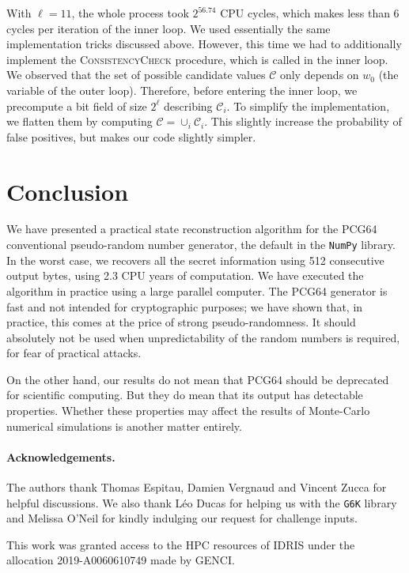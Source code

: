 \documentclass[submission,svgnames,journal=tosc]{iacrtrans}
\begin{document}
With $\ell=11$, the whole process took $2^{56.74}$ CPU cycles, which makes less
than 6 cycles per iteration of the inner loop. We used essentially the same
implementation tricks discussed above. However, this time we had to additionally
implement the \textsc{ConsistencyCheck} procedure, which is called in the inner
loop. We observed that the set of possible candidate values $\mathcal{C}$ only
depends on $w_0$ (the variable of the outer loop). Therefore, before entering
the inner loop, we precompute a bit field of size $2^\ell$ describing
$\mathcal{C}_i$. To simplify the implementation, we flatten them by computing
$\mathcal{C} = \cup_i \mathcal{C}_i$. This slightly increase the probability of
false positives, but makes our code slightly simpler.

\section{Conclusion}

We have presented a practical state reconstruction algorithm for the
\textsf{PCG64} conventional pseudo-random number generator, the default in the
\texttt{NumPy} library. In the worst case, we recovers all the secret
information using 512 consecutive output bytes, using 2.3 CPU years of
computation. We have executed the algorithm in practice using a large parallel
computer. The \textsf{PCG64} generator is fast and not intended for
cryptographic purposes; we have shown that, in practice, this comes at the price
of strong pseudo-randomness. It should absolutely not be used when
unpredictability of the random numbers is required, for fear of practical
attacks.

On the other hand, our results do not mean that \textsf{PCG64} should be
deprecated for scientific computing. But they do mean that its output has
detectable properties. Whether these properties may affect the results of
Monte-Carlo numerical simulations is another matter entirely.

\paragraph{Acknowledgements.} The authors thank Thomas Espitau, Damien Vergnaud
and Vincent Zucca for helpful discussions. We also thank Léo Ducas for helping
us with the \texttt{G6K} library and Melissa O'Neil for kindly indulging our
request for challenge inputs.

This work was granted access to the HPC resources of IDRIS under the allocation
2019-A0060610749 made by GENCI.



\end{document}
